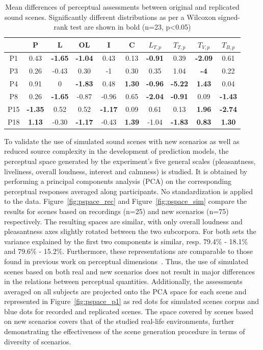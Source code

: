 \documentclass[11pt,a4paper]{article}
\begin{document}
\begin{table}[h]
\centering
\caption{Mean differences of perceptual assessments between original and replicated sound scenes. Significantly different distributions as per a Wilcoxon signed-rank test are shown in bold (n=23, p<0.05)}
\label{tab:ogrep}
\begin{tabular}{ c | c c c c c c c c c }
\hline
	 & P & L & OL & I & C & $L_{T, p}$ & $T_{T, p}$ & $T_{V, p}$ & $T_{B, p}$ \\ \hline
	P1 & 0.43 & \textbf{-1.65} & \textbf{-1.04} & 0.43 & 0.13 & \textbf{-0.91} & 0.39 & \textbf{-2.09} & 0.61 \\
	P3 & 0.26 & -0.43 & 0.30 & -1 & 0.30 & 0.35 & 1.04 & \textbf{-4} & 0.22 \\
	P4 & 0.91 & 0 & \textbf{-1.83} & 0.48 & \textbf{1.30} & \textbf{-0.96} & \textbf{-5.22} & \textbf{1.43} & 0.04 \\
	P8 & 0.26 & \textbf{-1.65} & -0.87 & -0.96 & 0.65 & \textbf{-2.04} & \textbf{-0.91} & 0.09 & \textbf{-1.43} \\
	P15 & \textbf{-1.35} & 0.52 & 0.52 & \textbf{-1.17} & 0.09 & 0.61 & 0.13 & \textbf{1.96} & \textbf{-2.74} \\
	P18 & \textbf{1.13} & -0.30 & \textbf{-1.17} & -0.43 & \textbf{1.39} & -1.04 & \textbf{-1.83} & \textbf{0.83} & \textbf{1.30} \\ \hline
\end{tabular}
\end{table}

To validate the use of simulated sound scenes with new scenarios as well as reduced source complexity in the development of prediction models, the perceptual space generated by the experiment's five general scales (pleasantness, liveliness, overall loudness, interest and calmness) is studied. It is obtained by performing a principal components analysis (PCA) on the corresponding perceptual responses averaged along participants. No standardization is applied to the data. Figure~\ref{fig:pspace_rec} and Figure~\ref{fig:pspace_sim} compare the results for scenes based on recordings (n=25) and new scenarios (n=75) respectively. The resulting spaces are similar, with only overall loudness and pleasantness axes slightly rotated between the two subcorpora. For both sets the variance explained by the first two components is similar, resp. 79.4\% - 18.1\% and 79.6\% - 15.2\%. Furthermore, these representations are comparable to those found in previous work on perceptual dimensions~\cite{axelsson2010, cain2013}. Thus, the use of simulated scenes based on both real and new scenarios does not result in major differences in the relations between perceptual quantities. Additionally, the assessments averaged on all subjects are projected onto the PCA space for each scene and represented in Figure~\ref{fig:pspace_p1} as red dots for simulated scenes corpus and blue dots for recorded and replicated scenes. The space covered by scenes based on new scenarios covers that of the studied real-life environments, further demonstrating the effectiveness of the scene generation procedure in terms of diversity of scenarios.
\end{document}
